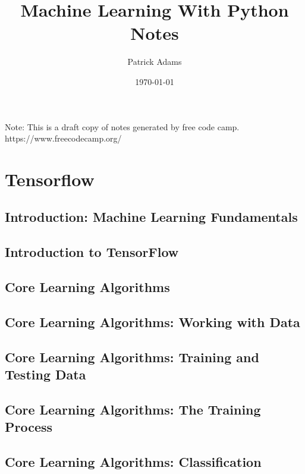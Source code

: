 \documentclass{article}%
\title{Machine Learning With Python Notes}%
\author{Patrick Adams}%
\date{\today}%
\begin{document}
%
\normalsize%
\maketitle%
\newpage%
Note: This is a draft copy of notes generated by free code camp.\newline%
%
https://www.freecodecamp.org/%
\newpage%
\tableofcontents%
\section{Tensorflow}%
\label{sec:Tensorflow}%
\subsection{Introduction: Machine Learning Fundamentals}%
\label{subsec:IntroductionMachineLearningFundamentals}%

%
\subsection{Introduction to TensorFlow}%
\label{subsec:IntroductiontoTensorFlow}%

%
\subsection{Core Learning Algorithms}%
\label{subsec:CoreLearningAlgorithms}%

%
\subsection{Core Learning Algorithms: Working with Data}%
\label{subsec:CoreLearningAlgorithmsWorkingwithData}%

%
\subsection{Core Learning Algorithms: Training and Testing Data}%
\label{subsec:CoreLearningAlgorithmsTrainingandTestingData}%

%
\subsection{Core Learning Algorithms: The Training Process}%
\label{subsec:CoreLearningAlgorithmsTheTrainingProcess}%

%
\subsection{Core Learning Algorithms: Classification}%
\label{subsec:CoreLearningAlgorithmsClassification}%
\end{document}
